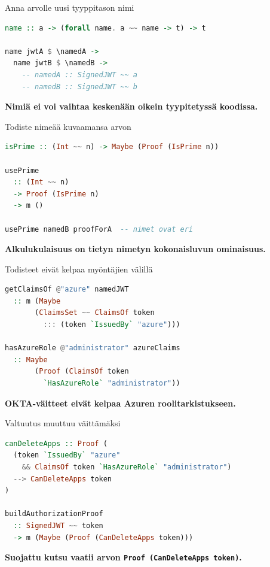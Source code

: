 \documentclass[10pt,aspectratio=169]{beamer}
\newcommand{\bottomline}[2][DeckAccent]{%
  \vfill{\color{#1}\large\bfseries #2}\par
}
\begin{document}
\begin{frame}[fragile]{Anna arvolle uusi tyyppitason nimi}
\begin{lstlisting}[style=deckcode,language=Haskell]
name :: a -> (forall name. a ~~ name -> t) -> t

name jwtA $ \namedA ->
  name jwtB $ \namedB ->
    -- namedA :: SignedJWT ~~ a
    -- namedB :: SignedJWT ~~ b
\end{lstlisting}
  \bottomline{Nimiä ei voi vaihtaa keskenään oikein tyypitetyssä koodissa.}
\end{frame}

\begin{frame}[fragile]{Todiste nimeää kuvaamansa arvon}
\begin{lstlisting}[style=deckcode,language=Haskell]
isPrime :: (Int ~~ n) -> Maybe (Proof (IsPrime n))

usePrime
  :: (Int ~~ n)
  -> Proof (IsPrime n)
  -> m ()

usePrime namedB proofForA  -- nimet ovat eri
\end{lstlisting}
  \bottomline{Alkulukulaisuus on tietyn nimetyn kokonaisluvun ominaisuus.}
\end{frame}

\begin{frame}[fragile]{Todisteet eivät kelpaa myöntäjien välillä}
\begin{lstlisting}[style=deckcode,language=Haskell]
getClaimsOf @"azure" namedJWT
  :: m (Maybe
       (ClaimsSet ~~ ClaimsOf token
         ::: (token `IssuedBy` "azure")))

hasAzureRole @"administrator" azureClaims
  :: Maybe
       (Proof (ClaimsOf token
         `HasAzureRole` "administrator"))
\end{lstlisting}
  \bottomline[DeckRed]{OKTA-väitteet eivät kelpaa Azuren roolitarkistukseen.}
\end{frame}

\begin{frame}[fragile]{Valtuutus muuttuu väittämäksi}
\begin{lstlisting}[style=deckcode,language=Haskell]
canDeleteApps :: Proof (
  (token `IssuedBy` "azure"
    && ClaimsOf token `HasAzureRole` "administrator")
  --> CanDeleteApps token
)

buildAuthorizationProof
  :: SignedJWT ~~ token
  -> m (Maybe (Proof (CanDeleteApps token)))
\end{lstlisting}
  \bottomline{Suojattu kutsu vaatii arvon \texttt{Proof (CanDeleteApps token)}.}
\end{frame}
\end{document}
